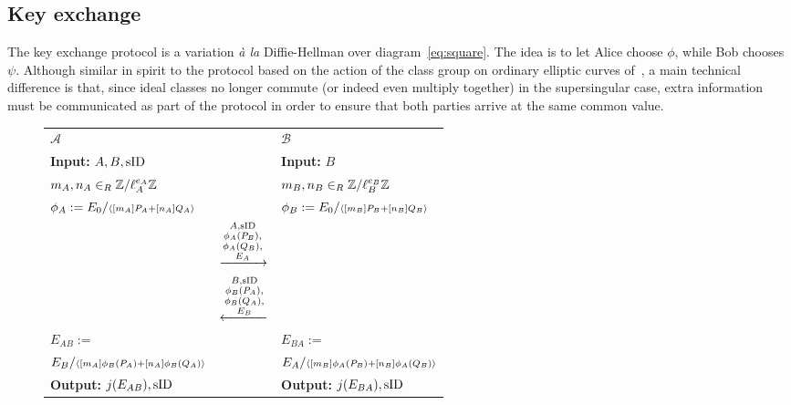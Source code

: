 \subsection{Key exchange}\label{subsec:kep}

The key exchange protocol is a variation \emph{\`a la} Diffie-Hellman
over diagram~\eqref{eq:square}. The idea is to let Alice choose
$\phi$, while Bob chooses $\psi$. Although similar in spirit to the
protocol based on the action of the class group on ordinary elliptic
curves of~\cite{Stol}, a main technical difference is that, since
ideal classes no longer commute (or indeed even multiply together) in
the supersingular case, extra information must be communicated as part
of the protocol in order to ensure that both parties arrive at the
same common value.

\begin{figure}[t]
\begin{center} 
\begin{tabular}{l c l}
\cline{1-1} \cline{3-3} 
$\mathcal{A}$ & & $\mathcal{B}$ \\ 
\cline{1-1} \cline{3-3} 
\textbf{Input:} $A,B,\operatorname{sID}$ & & \textbf{Input:} $B$ \\
$m_A,n_A \in_{R} {\mathbb{Z}}/\ell_A^{e_A}{\mathbb{Z}}$ & & $m_B,n_B \in_{R} {\mathbb{Z}}/\ell_B^{e_B}{\mathbb{Z}}$ \\
$\phi_A := E_0/\scriptstyle{{\langle [m_A]P_A+[n_A]Q_A \rangle}}$ & & $\phi_B :=
E_0/\scriptstyle{{\langle [m_B]P_B+[n_B]Q_B \rangle}}$ \\ 
 & $\xrightarrow[]{\substack{A, \operatorname{sID} \\ \phi_A(P_B),\\ \phi_A(Q_B),\\ E_A}} $ &  \\
  & $\xleftarrow[]{\substack{B, \operatorname{sID} \\ \phi_B(P_A),\\ \phi_B(Q_A),\\ E_B}} $ &  \\
$E_{AB} := $ &  & $ E_{BA} := $ \\
$E_B/\scriptstyle{{\langle [m_A]\phi_B(P_A)+[n_A]\phi_B(Q_A) \rangle}} $ &  & $
E_A/\scriptstyle{{\langle [m_B]\phi_A(P_B)+[n_B]\phi_A(Q_B) \rangle}}$ \\
\textbf{Output:} $j(E_{AB}), \operatorname{sID}$ & & \textbf{Output:} $j(E_{BA}), \operatorname{sID}$

\end{tabular}
\end{center}

\begin{center}
\end{center}
\end{figure}
